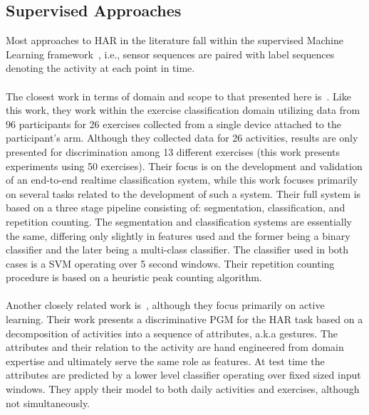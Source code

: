 \documentclass[12pt]{report}
\newcommand{\1}[0]{\mathbbm{1}}
\begin{document}
\subsection{Supervised Approaches}
Most approaches to \ac{HAR} in the literature fall within the
supervised Machine Learning framework~\cite{har-survey}, i.e.,
sensor sequences are paired with label sequences denoting the activity at each point in time.
\\\\
The closest work in terms of domain and scope to that presented here is~\cite{ms-activity}.
Like this work, they work within the exercise classification domain utilizing data
from 96 participants for 26 exercises collected from a single device attached to the
participant's arm. Although they collected data for 26 activities,
results are only presented for discrimination among 13 different
exercises (this work presents experiments using 50 exercises). Their focus is on the development
and validation of an end-to-end realtime classification system, while this work focuses primarily on
several tasks related to the development of such a system. Their full system is based on a three
stage pipeline consisting of: segmentation, classification, and repetition counting. The segmentation
and classification systems are essentially the same, differing only slightly in features used and the
former being a binary classifier and the later being a multi-class classifier. The classifier used
in both cases is a \ac{SVM} operating over 5 second windows. Their repetition counting procedure
is based on a heuristic peak counting algorithm.
\\\\
Another closely related work is~\cite{hierarchical-thesis}, although they focus
primarily on active learning. Their work presents a discriminative \ac{PGM} for the \ac{HAR}
task based on a decomposition of activities into a sequence of attributes, a.k.a gestures.
The attributes and their relation to the activity are hand engineered from domain expertise
and ultimately serve the same role as features. At test time the attributes are predicted by a
lower level classifier operating over fixed sized input windows. They apply their model to both
daily activities and exercises, although not simultaneously.
\end{document}
